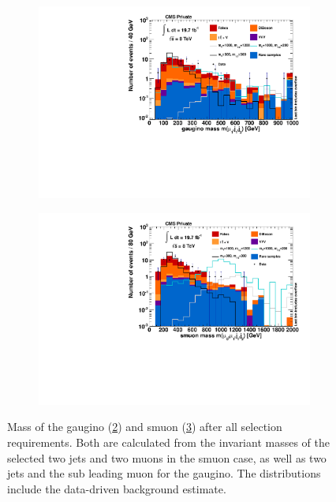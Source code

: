 \begin{figure}[!htb]
  \centering
  \begin{subfigure}[b]{0.6\textwidth}
    \centering
    \includegraphics[width=\textwidth]{plots/m_gaugino.pdf}
    \caption{\label{fig:m_gaugino}}
  \end{subfigure}
\end{figure}
\begin{figure}[!htb]
  \ContinuedFloat
  \centering
  \begin{subfigure}[b]{0.6\textwidth}
    \centering
    \includegraphics[width=\textwidth]{plots/m_smuon.pdf}
    \caption{\label{fig:m_smuon}}
  \end{subfigure}
  \caption{Mass of the gaugino (\ref{fig:m_gaugino}) and smuon (\ref{fig:m_smuon}) after all selection requirements. Both are calculated from the invariant masses of the selected two jets and two muons in the smuon case, as well as two jets and the sub leading muon for the gaugino. The distributions include the data-driven background estimate.}
  \label{fig:final-dist}
\end{figure}

